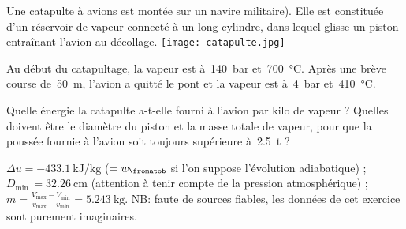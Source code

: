 \begin{Exercise}[title=Catapulte de porte-avions]
Une catapulte à avions est montée sur un navire militaire). Elle est constituée d’un réservoir de vapeur connecté à un long cylindre, dans lequel glisse un piston entraînant l’avion au décollage.
  \centering
  \texttt{[image: catapulte.jpg]}

	Au début du catapultage, la vapeur est à~\SI{140}{\bar} et~\SI{700}{\degreeCelsius}. Après une brève course de~\SI{50}{\metre}, l’avion a quitté le pont et la vapeur est à~\SI{4}{\bar} et~\SI{410}{\degreeCelsius}.


		\Question Quelle énergie la catapulte a-t-elle fourni à l’avion par kilo de vapeur ?
		\Question Quelles doivent être le diamètre du piston et la masse totale de vapeur, pour que la poussée fournie à l’avion soit toujours supérieure à~\SI{2,5}{\tonne} ?

\end{Exercise}
\begin{Answer}
  \Question $\Delta u = \SI{-433,1}{\kilo\joule\per\kilogram}$ ($=w_\fromatob$ si l’on suppose l’évolution adiabatique) ;
\Question $D_\text{min.} = \SI{32,26}{\centi\metre}$ (attention à tenir compte de la
pression atmosphérique) ;
$m = \frac{V_\text{max} - V_\text{min}}{v_\text{max} - v_\text{min}} = \SI{5,243}{\kilogram}$.
NB: faute de sources fiables, les données de cet exercice sont purement imaginaires.
\end{Answer}

